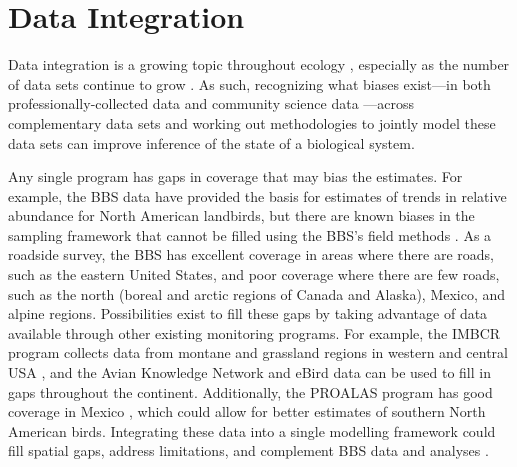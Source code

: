\section{Data Integration}

\par Data integration is a growing topic throughout ecology \citep{isaac_data_2020, miller_recent_2019, pacifici_integrating_2017, boersch-supan_integrating_2021}, especially as the number of data sets continue to grow \citep{binley_minimizing_2023}.
As such, recognizing what biases exist---in both professionally-collected data and community science data \citep{binley_data_2023}---across complementary data sets and working out methodologies to jointly model these data sets can improve inference of the state of a biological system.

\par Any single program has gaps in coverage that may bias the estimates. 
For example, the BBS data have provided the basis for estimates of trends in relative abundance for North American landbirds, but there are known biases in the sampling framework that cannot be filled using the BBS’s field methods \citep{thogmartin_sensitivity_2010, solymos_lessons_2020, us_geological_survey_strategic_2020}. 
As a roadside survey, the BBS has excellent coverage in areas where there are roads, such as the eastern United States, and poor coverage where there are few roads, such as the north (boreal and arctic regions of Canada and Alaska), Mexico, and alpine regions. 
Possibilities exist to fill these gaps by taking advantage of data available through other existing monitoring programs. 
For example, the IMBCR program collects data from montane and grassland regions in western and central USA \citep{pavlacky_statistically_2017}, and the Avian Knowledge Network \citep{iliff_avian_2009} and eBird data \citep{sullivan_ebird_2014} can be used to fill in gaps throughout the continent. 
Additionally, the PROALAS program has good coverage in Mexico \citep{ruiz_gutierrez_proalas_2020}, which could allow for better estimates of southern North American birds. 
Integrating these data into a single modelling framework could fill spatial gaps, address limitations, and complement BBS data and analyses \citep{miller_recent_2019, isaac_data_2020}.

